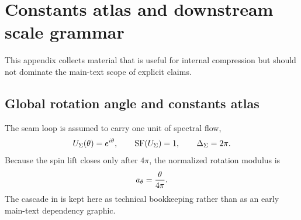 \section{Constants atlas and downstream scale grammar}
\label{app:constants}

This appendix collects material that is useful for internal compression but should not dominate the main-text scope of explicit claims.

\subsection{Global rotation angle and constants atlas}

The seam loop is assumed to carry one unit of spectral flow,
\[
U_{\Sigma}(\theta)=e^{i\theta},
\qquad
\operatorname{SF}(U_{\Sigma})=1,
\qquad
\Delta_{\Sigma}=2\pi.
\]
Because the spin lift closes only after $4\pi$, the normalized rotation modulus is
\[
a_\theta=\frac{\theta}{4\pi}.
\]
The cascade in  is kept here as technical bookkeeping rather than as an early main-text dependency graphic.

